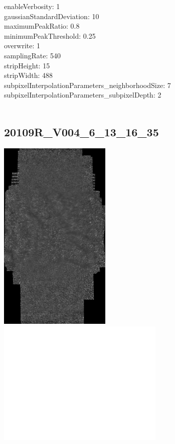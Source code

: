\documentclass[11pt]{article}
\begin{document}
enableVerbosity: 1\\
gaussianStandardDeviation: 10\\
maximumPeakRatio: 0.8\\
minimumPeakThreshold: 0.25\\
overwrite: 1\\
samplingRate: 540\\
stripHeight: 15\\
stripWidth: 488\\
subpixelInterpolationParameters\_neighborhoodSize: 7\\
subpixelInterpolationParameters\_subpixelDepth: 2\\
\\
\newpage

\subsection{20109R\_V004\_6\_13\_16\_35}
\includegraphics[width=0.40\textwidth, valign=m]{referenceframes/aoslo/20109R_V004_6_13_16_35_dwt_nostim_gamscaled_bandfilt_refframe.jpg}
\includegraphics[width=0.60\textwidth, valign=m]{eyepositiontraces/aoslo/20109R_V004_6_13_16_35.jpg}\\
\end{document}
